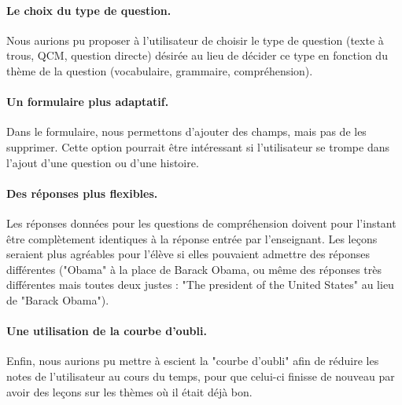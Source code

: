 \paragraph{Le choix du type de question.}
Nous aurions pu proposer à l'utilisateur de choisir le type de question (texte à trous, QCM, question directe) désirée au lieu de décider ce type en fonction du thème de la question (vocabulaire, grammaire, compréhension).

\paragraph{Un formulaire plus adaptatif.}
Dans le formulaire, nous permettons d'ajouter des champs, mais pas de les supprimer. Cette option pourrait être intéressant si l'utilisateur se trompe dans l'ajout d'une question ou d'une histoire.

\paragraph{Des réponses plus flexibles.}
Les réponses données pour les questions de compréhension doivent pour l'instant être complètement identiques à la réponse entrée par l'enseignant. Les leçons seraient plus agréables pour l'élève si elles pouvaient admettre des réponses différentes ("Obama" à la place de Barack Obama, ou même des réponses très différentes mais toutes deux justes : "The president of the United States" au lieu de "Barack Obama").

\paragraph{Une utilisation de la courbe d'oubli.}
Enfin, nous aurions pu mettre à escient la "courbe d'oubli" afin de réduire les notes de l'utilisateur au cours du temps, pour que celui-ci finisse de nouveau par avoir des leçons sur les thèmes où il était déjà bon.